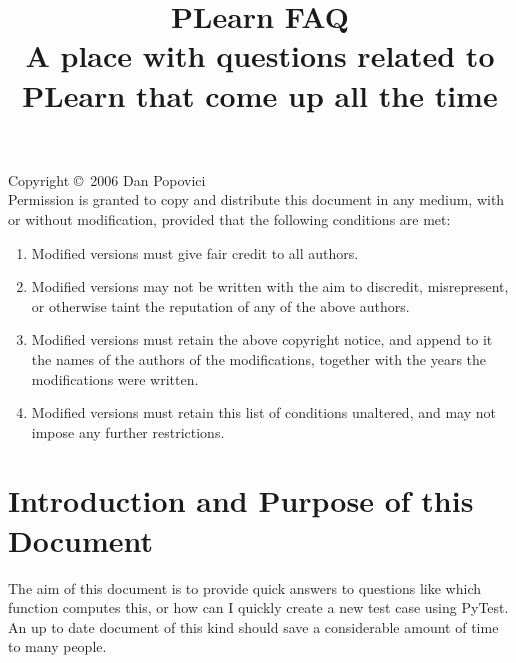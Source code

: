 \documentclass[11pt]{book}
\title{\Huge PLearn FAQ\\ \Large A place with questions related to PLearn that come up all the time}
\begin{document}
\thispagestyle{empty}

\maketitle

\pagebreak

\vspace*{10cm}



Copyright \copyright\ 2006 Dan Popovici \\

Permission is granted to copy and distribute this document in any medium,
with or without modification, provided that the following conditions are
met:

\begin{enumerate}
\item Modified versions must give fair credit to all authors.
\item Modified versions may not be written with the aim to discredit, misrepresent, or otherwise taint the
      reputation of any of the above authors.
\item Modified versions must retain the above copyright notice, and append to
   it the names of the authors of the modifications, together with the years the
   modifications were written.
\item Modified versions must retain this list of conditions unaltered, 
    and may not impose any further restrictions.
\end{enumerate}


\pagebreak

\tableofcontents

\cleardoublepage\pagebreak
{}


\section{ Introduction and Purpose of this Document } 

The aim of this document is to provide quick answers to questions like which function computes this, or how can I quickly create a new test case using PyTest. An up to date document of this kind should save a considerable amount of time to many people. 
\end{document}
